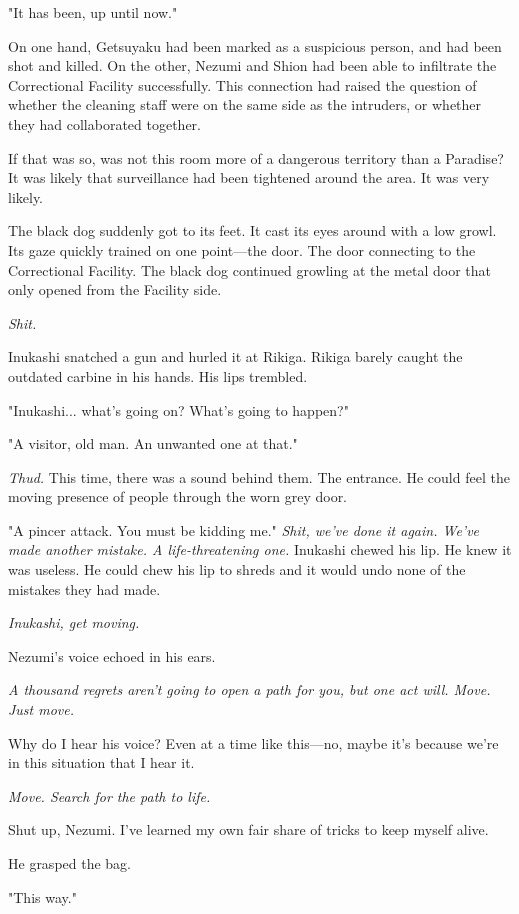 "It has been, up until now."

On one hand, Getsuyaku had been marked as a suspicious person, and had
been shot and killed. On the other, Nezumi and Shion had been able to
infiltrate the Correctional Facility successfully. This connection had
raised the question of whether the cleaning staff were on the same side
as the intruders, or whether they had collaborated together.

If that was so, was not this room more of a dangerous territory than a
Paradise? It was likely that surveillance had been tightened around the
area. It was very likely.

The black dog suddenly got to its feet. It cast its eyes around with a
low growl. Its gaze quickly trained on one point---the door. The door
connecting to the Correctional Facility. The black dog continued
growling at the metal door that only opened from the Facility side.

\emph{Shit.}

Inukashi snatched a gun and hurled it at Rikiga. Rikiga barely caught
the outdated carbine in his hands. His lips trembled.

"Inukashi... what's going on? What's going to happen?"

"A visitor, old man. An unwanted one at that."

\emph{Thud.} This time, there was a sound behind them. The entrance. He could
feel the moving presence of people through the worn grey door.

"A pincer attack. You must be kidding me." \emph{Shit, we've done it again.
We've made another mistake. A life-threatening one.} Inukashi chewed his
lip. He knew it was useless. He could chew his lip to shreds and it
would undo none of the mistakes they had made.

\emph{Inukashi, get moving.}

Nezumi's voice echoed in his ears.

\emph{A thousand regrets aren't going to open a path for you, but one act
will. Move. Just move.}

Why do I hear his voice? Even at a time like this---no, maybe it's because
we're in this situation that I hear it.

\emph{Move. Search for the path to life.}

Shut up, Nezumi. I've learned my own fair share of tricks to keep myself
alive.

He grasped the bag.

"This way."

